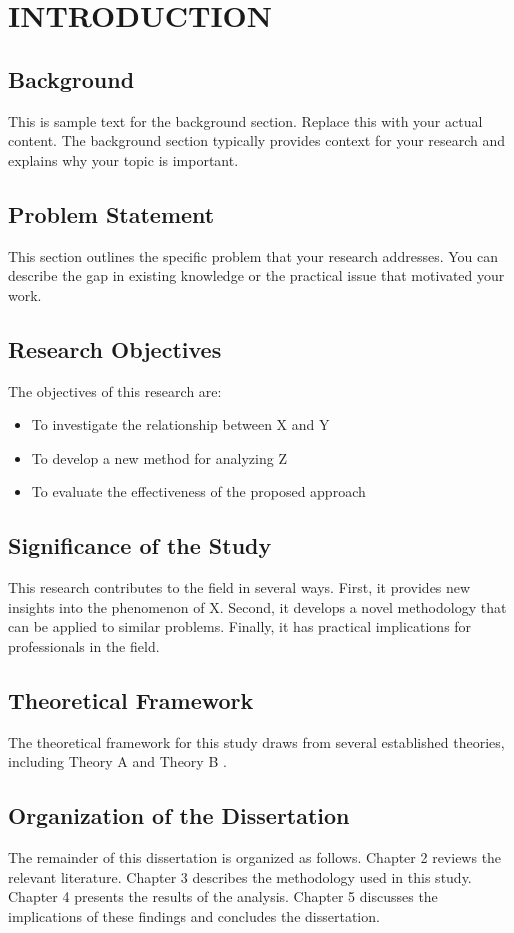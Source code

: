 \chapter{INTRODUCTION}

\section{Background}
This is sample text for the background section. Replace this with your actual content. The background section typically provides context for your research and explains why your topic is important.

\section{Problem Statement}
This section outlines the specific problem that your research addresses. You can describe the gap in existing knowledge or the practical issue that motivated your work.

\section{Research Objectives}
The objectives of this research are:
\begin{itemize}
    \item To investigate the relationship between X and Y
    \item To develop a new method for analyzing Z
    \item To evaluate the effectiveness of the proposed approach
\end{itemize}

\section{Significance of the Study}
This research contributes to the field in several ways. First, it provides new insights into the phenomenon of X. Second, it develops a novel methodology that can be applied to similar problems. Finally, it has practical implications for professionals in the field.

\section{Theoretical Framework}
The theoretical framework for this study draws from several established theories, including Theory A \cite{author2020} and Theory B \cite{author2021}.

\section{Organization of the Dissertation}
The remainder of this dissertation is organized as follows. Chapter 2 reviews the relevant literature. Chapter 3 describes the methodology used in this study. Chapter 4 presents the results of the analysis. Chapter 5 discusses the implications of these findings and concludes the dissertation.
